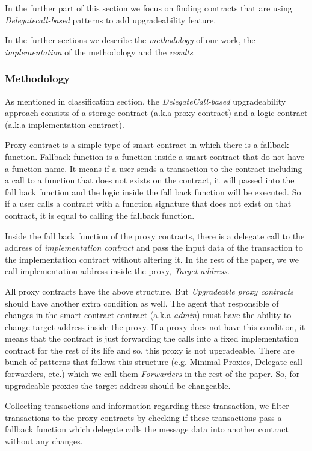 In the further part of this section we focus on finding contracts that are using \textit{Delegatecall-based} patterns to add upgradeability feature.



In the further sections we describe the \textit{methodology} of our work, the \textit{implementation} of the methodology and the \textit{results}.  

\subsubsection{Methodology}
As mentioned in classification section, the \textit{DelegateCall-based} upgradeability approach consists of a storage contract (a.k.a proxy contract) and a logic contract (a.k.a implementation contract). 

Proxy contract is a simple type of smart contract in which there is a fallback function. Fallback function is a function inside a smart contract that do not have a function name. It means if a user sends a transaction to the contract including a call to a function that does not exists on the contract, it will passed into the fall back function and the logic inside the fall back function will be executed. So if a user calls a contract with a function signature that does not exist on that contract, it is equal to calling the fallback function.

Inside the fall back function of the proxy contracts, there is a delegate call to the address of \textit{implementation contract} and pass the input data of the transaction to the implementation contract without altering it. In the rest of the paper, we we call implementation address inside the proxy, \emph{Target address}.

All proxy contracts have the above structure. But \textit{Upgradeable proxy contracts} should have another extra condition as well. The agent that responsible of changes in the smart contract contract (a.k.a \emph{admin}) must have the ability to change target address inside the proxy. If a proxy does not have this condition, it means that the contract is just forwarding the calls into a fixed implementation contract for the rest of its life and so, this proxy is not upgradeable. There are bunch of patterns that follows this structure (e.g. Minimal Proxies, Delegate call forwarders, etc.) which we call them \textit{Forwarders} in the rest of the paper. So, for upgradeable proxies the target address should be changeable.

Collecting transactions and information regarding these transaction, we filter transactions to the proxy contracts by checking if these transactions pass a fallback function which delegate calls the message data into another contract without any changes.

